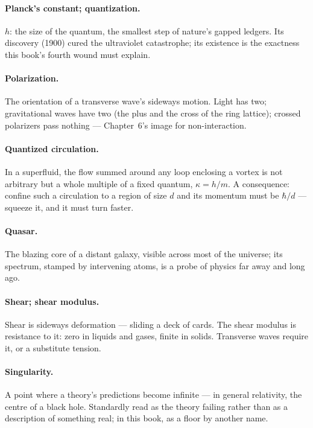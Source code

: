 \documentclass[fontsize=11pt,paper=a4,pagesize=auto,parskip=half-]{scrbook}
\begin{document}
\paragraph{Planck's constant; quantization.} $h$: the size of the quantum, the smallest step of nature's gapped ledgers. Its discovery (1900) cured the ultraviolet catastrophe; its existence is the exactness this book's fourth wound must explain.

\paragraph{Polarization.} The orientation of a transverse wave's sideways motion. Light has two; gravitational waves have two (the plus and the cross of the ring lattice); crossed polarizers pass nothing --- Chapter~6's image for non-interaction.

\paragraph{Quantized circulation.} In a superfluid, the flow summed around any loop enclosing a vortex is not arbitrary but a whole multiple of a fixed quantum, $\kappa = h/m$. A consequence: confine such a circulation to a region of size $d$ and its momentum must be $\hbar/d$ --- squeeze it, and it must turn faster.

\paragraph{Quasar.} The blazing core of a distant galaxy, visible across most of the universe; its spectrum, stamped by intervening atoms, is a probe of physics far away and long ago.

\paragraph{Shear; shear modulus.} Shear is sideways deformation --- sliding a deck of cards. The shear modulus is resistance to it: zero in liquids and gases, finite in solids. Transverse waves require it, or a substitute tension.

\paragraph{Singularity.} A point where a theory's predictions become infinite --- in general relativity, the centre of a black hole. Standardly read as the theory failing rather than as a description of something real; in this book, as a floor by another name.
\end{document}
